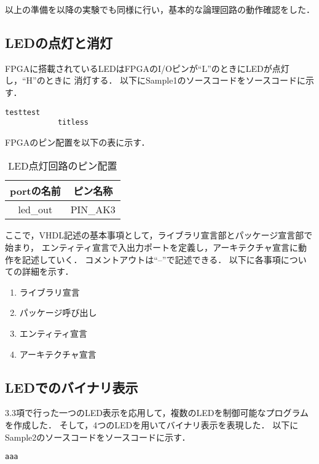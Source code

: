 \documentclass{ltjsarticle}
\begin{document}
		以上の準備を以降の実験でも同様に行い，基本的な論理回路の動作確認をした．

	\subsection{LEDの点灯と消灯}
		FPGAに搭載されているLEDはFPGAのI/Oピンが``L''のときにLEDが点灯し，``H''のときに
		消灯する．
		以下にSample1のソースコードをソースコードに示す．

		\begin{lstlisting}[caption=sample1, label=code:sample1]
			testtest
			titless
		\end{lstlisting}

		FPGAのピン配置を以下の表に示す．

		\begin{table}[H]
		\begin{center}
		\caption{LED点灯回路のピン配置}
		\label{tab:LED1}
		\begin{tabular}{cc} \toprule
			portの名前 & ピン名称 \\ \hline
			led\_out & PIN\_AK3\\
		\bottomrule
		\end{tabular}
		\end{center}
		\end{table}

		ここで，VHDL記述の基本事項として，ライブラリ宣言部とパッケージ宣言部で始まり，
		エンティティ宣言で入出力ポートを定義し，アーキテクチャ宣言に動作を記述していく．
		コメントアウトは``--''で記述できる．
		以下に各事項についての詳細を示す．
	
		\begin{enumerate}
			\item ライブラリ宣言
			\item パッケージ呼び出し
			\item エンティティ宣言
			\item アーキテクチャ宣言
		\end{enumerate}

	\subsection{LEDでのバイナリ表示}
		3.3項で行った一つのLED表示を応用して，複数のLEDを制御可能なプログラムを作成した．
		そして，4つのLEDを用いてバイナリ表示を表現した．
		以下にSample2のソースコードをソースコードに示す．

		\begin{lstlisting}[caption=sample2, label=code:sample2]
			aaa
		\end{lstlisting}
\end{document}
